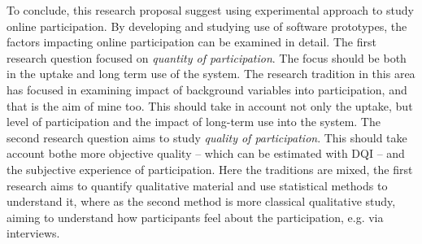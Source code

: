 \documentclass[journal,a4paper]{IEEEtran}
\begin{document}
To conclude, this research proposal suggest using experimental approach to study online participation. By developing and studying use of software prototypes, the factors impacting online participation can be examined in detail.
The first research question focused on \textit{quantity of participation}. The focus should be both in the uptake and long term use of the system. The research tradition in this area has focused in examining impact of background variables into participation, and that is the aim of mine too. This should take in account not only the uptake, but level of participation and the impact of long-term use into the system.
The second research question aims to study \textit{quality of participation}. This should take account bothe more objective quality -- which can be estimated with DQI -- and the subjective experience of participation. Here the traditions are mixed, the first research aims to quantify qualitative material and use statistical methods to understand it, where as the second method is more classical qualitative study, aiming to understand how participants feel about the participation, e.g. via interviews.



\end{document}

